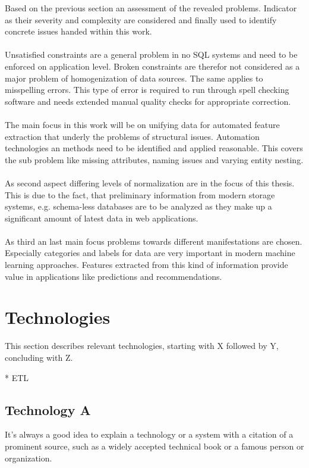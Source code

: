 Based on the previous section an assessment of the revealed problems. Indicator as their severity and complexity are considered and finally used to identify concrete issues handed within this work. 
\\\\
Unsatisfied constraints are a general problem in no SQL systems and need to be enforced on application level. Broken constraints are therefor not considered as a major problem of homogenization of data sources. The same applies to misspelling errors. This type of error is required to run through spell checking software and needs extended manual quality checks for appropriate correction. 
\\\\
The main focus in this work will be on unifying data for automated feature extraction that underly the problems of structural issues. Automation technologies an methods need to be identified and applied reasonable. This covers the sub problem like missing attributes, naming issues and varying entity nesting.
\\\\
As second aspect differing levels of normalization are in the focus of this thesis. This is due to the fact, that preliminary information from modern storage systems, e.g. schema-less databases are to be analyzed as they make up a significant amount of latest data in web applications.
\\\\
As third an last main focus problems towards different manifestations are chosen. Especially categories and labels for data are very important in modern machine learning approaches. Features extracted from this kind of information provide value in applications like predictions and recommendations.

\section{Technologies \label{sec:tech}}

This section describes relevant technologies, starting with X followed by Y, concluding with Z.

* ETL

\subsection{Technology A\label{sec:aaa}}

It's always a good idea to explain a technology or a system with a citation of a prominent source, such as a widely accepted technical book or a famous person or organization. 

